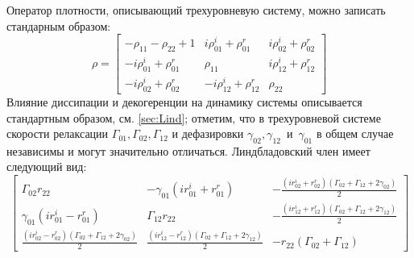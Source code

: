 Оператор плотности, описывающий трехуровневую систему, можно записать стандарным образом:
\begin{equation}
\rho = \left[\begin{matrix}- \rho_{11} - \rho_{22} + 1 & i \rho^{i}_{01} + \rho^{r}_{01} & i \rho^{i}_{02} + \rho^{r}_{02}\\- i \rho^{i}_{01} + \rho^{r}_{01} & \rho_{11} & i \rho^{i}_{12} + \rho^{r}_{12}\\- i \rho^{i}_{02} + \rho^{r}_{02} & - i \rho^{i}_{12} + \rho^{r}_{12} & \rho_{22}\end{matrix}\right]
\end{equation}
Влияние диссипации и декогеренции на динамику системы описывается стандартным образом, см. \ref{sec:Lind}; отметим, что в трехуровневой системе скорости релаксации $ \Gamma_{01}, \Gamma_{02}, \Gamma_{12}$ и дефазировки $\gamma_{02}, \gamma_{12}$~и~$\gamma_{01}$ в общем случае независимы и могут значительно отличаться. Линдбладовский член имеет следующий вид:
\begin{equation}
\left[\begin{matrix}\Gamma_{02} r_{22} & - \gamma_{01} \left(i r^{i}_{01} + r^{r}_{01}\right) & - \frac{\left(i r^{i}_{02} + r^{r}_{02}\right) \left(\Gamma_{02} + \Gamma_{12} + 2\gamma_{02}\right)}{2}\\ \gamma_{01} \left(i r^{i}_{01} - r^{r}_{01}\right) & \Gamma_{12} r_{22} & - \frac{\left(i r^{i}_{12} + r^{r}_{12}\right) \left(\Gamma_{02} + \Gamma_{12} + 2\gamma_{12}\right)}{2}\\\frac{\left(i r^{i}_{02} - r^{r}_{02}\right) \left(\Gamma_{02} + \Gamma_{12} + 2\gamma_{02}\right)}{2} & \frac{\left(i r^{i}_{12} - r^{r}_{12}\right) \left(\Gamma_{02} + \Gamma_{12} + 2\gamma_{12}\right)}{2} & - r_{22} \left(\Gamma_{02} + \Gamma_{12}\right)\end{matrix}\right]
\label{eq: Lindblad_3ls}
\end{equation}

